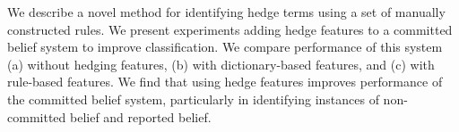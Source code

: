 We describe a novel method for identifying hedge terms using a set of manually constructed rules. We present experiments adding hedge features to a committed belief system to improve classification. We compare performance of this system (a) without hedging features, (b) with dictionary-based features, and (c) with rule-based features. We find that using hedge features improves performance of the committed belief system, particularly in identifying instances of non-committed belief and reported belief.
